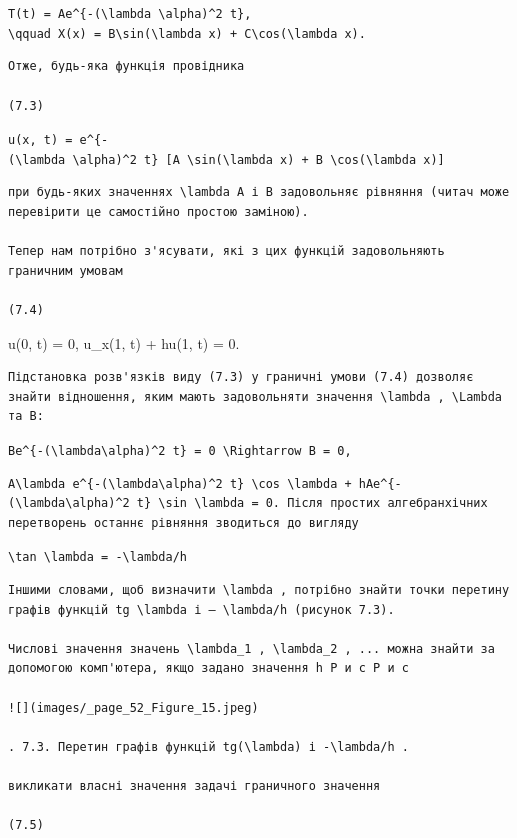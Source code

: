 \documentclass[
  ukrainian,
]{article}
\begin{document}
\texttt{T(t)\ =\ Ae\^{}\{-(\textbackslash{}lambda\ \textbackslash{}alpha)\^{}2\ t\},}
\texttt{\textbackslash{}qquad\ X(x)\ =\ B\textbackslash{}sin(\textbackslash{}lambda\ x)\ +\ C\textbackslash{}cos(\textbackslash{}lambda\ x).}

\begin{verbatim}
Отже, будь-яка функція провідника

(7.3)
\end{verbatim}

\texttt{u(x,\ t)\ =\ e\^{}\{-(\textbackslash{}lambda\ \textbackslash{}alpha)\^{}2\ t\}\ {[}A\ \textbackslash{}sin(\textbackslash{}lambda\ x)\ +\ B\ \textbackslash{}cos(\textbackslash{}lambda\ x){]}}

\begin{verbatim}
при будь-яких значеннях \lambda A і B задовольняє рівняння (читач може перевірити це самостійно простою заміною).

Тепер нам потрібно з'ясувати, які з цих функцій задовольняють граничним умовам

(7.4)
\end{verbatim}

u(0, t) = 0, u\_x(1, t) + hu(1, t) = 0.

\begin{verbatim}
Підстановка розв'язків виду (7.3) у граничні умови (7.4) дозволяє знайти відношення, яким мають задовольняти значення \lambda , \Lambda та B:
\end{verbatim}

\texttt{Be\^{}\{-(\textbackslash{}lambda\textbackslash{}alpha)\^{}2\ t\}\ =\ 0\ \textbackslash{}Rightarrow\ B\ =\ 0,}

\begin{verbatim}
A\lambda e^{-(\lambda\alpha)^2 t} \cos \lambda + hAe^{-(\lambda\alpha)^2 t} \sin \lambda = 0. Після простих алгебранхічних перетворень останнє рівняння зводиться до вигляду
\end{verbatim}

\texttt{\textbackslash{}tan\ \textbackslash{}lambda\ =\ -\textbackslash{}lambda/h}

\begin{verbatim}
Іншими словами, щоб визначити \lambda , потрібно знайти точки перетину графів функцій tg \lambda і — \lambda/h (рисунок 7.3).

Числові значення значень \lambda_1 , \lambda_2 , ... можна знайти за допомогою комп'ютера, якщо задано значення h Р и с Р и с

![](images/_page_52_Figure_15.jpeg)

. 7.3. Перетин графів функцій tg(\lambda) і -\lambda/h .

викликати власні значення задачі граничного значення

(7.5)
\end{verbatim}
\end{document}
